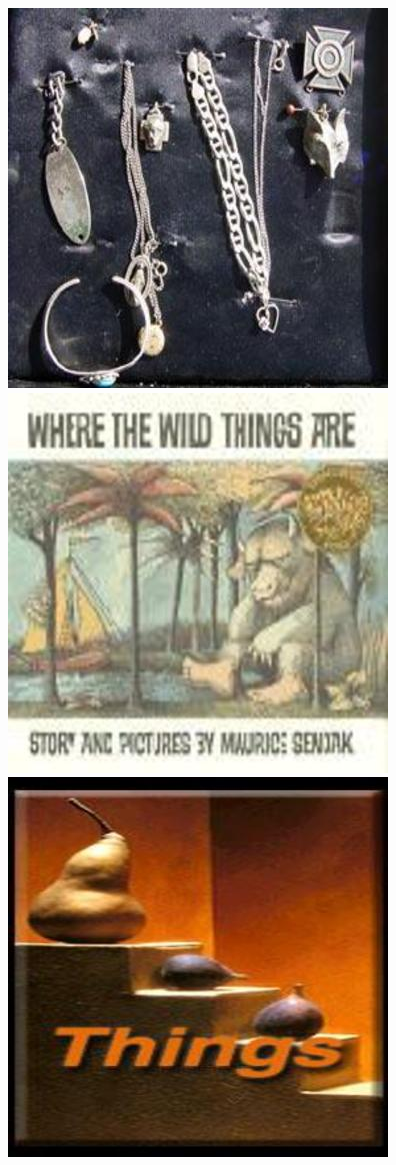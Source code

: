 \documentclass[oneside,a4paper,english,links]{article}
\begin{document}
\begin{figure}[htb]
\centering
\includegraphics[scale=0.20]{imagenes/image_0036}
\includegraphics[scale=0.20]{imagenes/image_0041}
\includegraphics[scale=0.20]{imagenes/image_0042}

\end{figure}
\end{document}
